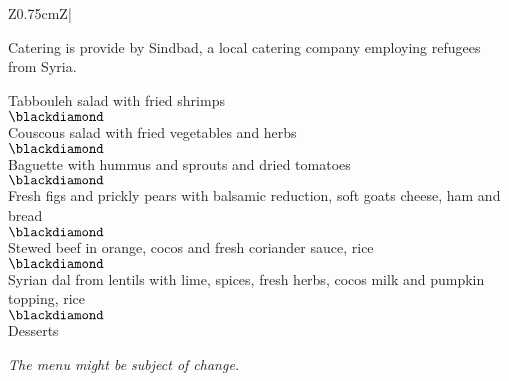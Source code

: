 \begin{landscape}
\begin{center}
\begin{tabular}{Z{0.75cm}Z{\socialEventBoxWidth}|}
\begin{minipage}[t]{\socialEventBoxWidth}
\begin{minipage}[t]{0.47\linewidth}
          \vspace{\baselineskip}
          Catering is provide by Sindbad, a local catering company employing refugees from Syria.
        \end{minipage}
        \hfill
        \noindent\begin{minipage}[t]{0.47\linewidth}
          \begin{center}
            \noindent Tabbouleh salad with fried shrimps\\
            $\blackdiamond$\\
            Couscous salad with fried vegetables and herbs\\
            $\blackdiamond$\\
            Baguette with hummus and sprouts and dried tomatoes\\
            $\blackdiamond$\\
            Fresh figs and prickly pears with balsamic reduction, soft goats cheese, ham and bread\\
            $\blackdiamond$\\
            Stewed beef in orange, cocos and fresh coriander sauce, rice\\
            $\blackdiamond$\\
            Syrian dal from lentils with lime, spices, fresh herbs, cocos milk and pumpkin topping, rice\\
            $\blackdiamond$\\
            Desserts

            \noindent \emph{The menu might be subject of change.}
          \end{center}
        \end{minipage}
      \end{minipage}
      \vspace{0.4\multicolsep}
      \tabularnewline
    \end{tabular}
  \end{center}
  \newpage
\end{landscape}
\renewcommand{\arraystretch}{1.0}
